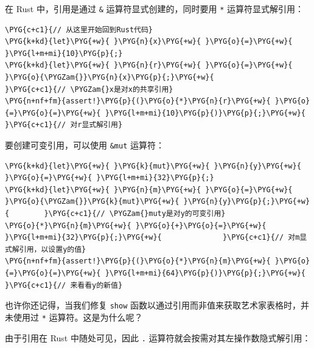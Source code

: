 在 Rust 中，引用是通过 \texttt{\&} 运算符显式创建的，同时要用 \texttt{*} 运算符显式解引用：

\begin{Verbatim}[commandchars=\\\{\},breaklines=true,breakanywhere=true,fontsize=\codefont,xleftmargin=17bp]
\PYG{c+c1}{// 从这里开始回到Rust代码}
\PYG{k+kd}{let}\PYG{+w}{ }\PYG{n}{x}\PYG{+w}{ }\PYG{o}{=}\PYG{+w}{ }\PYG{l+m+mi}{10}\PYG{p}{;}
\PYG{k+kd}{let}\PYG{+w}{ }\PYG{n}{r}\PYG{+w}{ }\PYG{o}{=}\PYG{+w}{ }\PYG{o}{\PYGZam{}}\PYG{n}{x}\PYG{p}{;}\PYG{+w}{            }\PYG{c+c1}{// \PYGZam{}x是对x的共享引用}
\PYG{n+nf+fm}{assert!}\PYG{p}{(}\PYG{o}{*}\PYG{n}{r}\PYG{+w}{ }\PYG{o}{=}\PYG{o}{=}\PYG{+w}{ }\PYG{l+m+mi}{10}\PYG{p}{)}\PYG{p}{;}\PYG{+w}{     }\PYG{c+c1}{// 对r显式解引用}
\end{Verbatim}

要创建可变引用，可以使用 \texttt{\&mut} 运算符：

\begin{Verbatim}[commandchars=\\\{\},breaklines=true,breakanywhere=true,fontsize=\codefont,xleftmargin=17bp]
\PYG{k+kd}{let}\PYG{+w}{ }\PYG{k}{mut}\PYG{+w}{ }\PYG{n}{y}\PYG{+w}{ }\PYG{o}{=}\PYG{+w}{ }\PYG{l+m+mi}{32}\PYG{p}{;}
\PYG{k+kd}{let}\PYG{+w}{ }\PYG{n}{m}\PYG{+w}{ }\PYG{o}{=}\PYG{+w}{ }\PYG{o}{\PYGZam{}}\PYG{k}{mut}\PYG{+w}{ }\PYG{n}{y}\PYG{p}{;}\PYG{+w}{        }\PYG{c+c1}{// \PYGZam{}muty是对y的可变引用}
\PYG{o}{*}\PYG{n}{m}\PYG{+w}{ }\PYG{o}{+}\PYG{o}{=}\PYG{+w}{ }\PYG{l+m+mi}{32}\PYG{p}{;}\PYG{+w}{              }\PYG{c+c1}{// 对m显式解引用，以设置y的值}
\PYG{n+nf+fm}{assert!}\PYG{p}{(}\PYG{o}{*}\PYG{n}{m}\PYG{+w}{ }\PYG{o}{=}\PYG{o}{=}\PYG{+w}{ }\PYG{l+m+mi}{64}\PYG{p}{)}\PYG{p}{;}\PYG{+w}{     }\PYG{c+c1}{// 来看看y的新值}
\end{Verbatim}

也许你还记得，当我们修复 \texttt{show} 函数以通过引用而非值来获取艺术家表格时，并未使用过 \texttt{*} 运算符。这是为什么呢？

由于引用在 Rust 中随处可见，因此 \texttt{.} 运算符就会按需对其左操作数隐式解引用：

